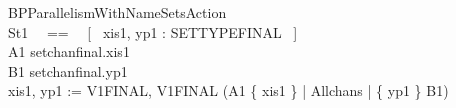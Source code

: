 \begin{circus}

 
 


 


 \circprocess BPParallelismWithNameSetsAction \circdef \circbegin \\
    \circstate St1 ~~==~~ [~ xis1, yp1 : SETTYPEFINAL ~] \\
    A1 \circdef %
      setchanfinal.xis1 \then \Skip \\
    B1 \circdef %
      setchanfinal.yp1 \then \Skip \\
    \circspot xis1, yp1 := V1FINAL, V1FINAL \circseq (A1 \lpar \{ xis1 \} | Allchans | \{ yp1 \} \rpar B1) \\
 \circend \\


\end{circus}
